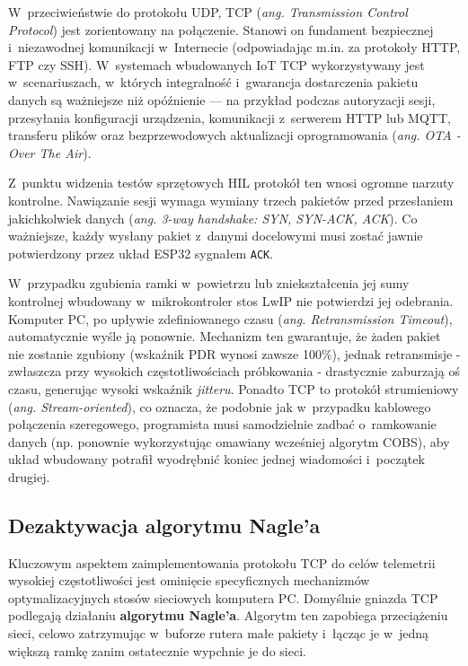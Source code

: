 W~przeciwieństwie do protokołu UDP, TCP (\textit{ang. Transmission Control Protocol}) jest zorientowany na połączenie.
Stanowi on fundament bezpiecznej i~niezawodnej komunikacji w~Internecie (odpowiadając m.in. za protokoły HTTP, FTP czy SSH).
W~systemach wbudowanych IoT TCP wykorzystywany jest w~scenariuszach, w~których integralność i~gwarancja dostarczenia pakietu danych są ważniejsze niż opóźnienie — na przykład podczas autoryzacji sesji, przesyłania konfiguracji urządzenia, komunikacji z~serwerem HTTP lub MQTT, transferu plików oraz bezprzewodowych aktualizacji oprogramowania (\textit{ang. OTA - Over The Air}).

Z~punktu widzenia testów sprzętowych HIL protokół ten wnosi ogromne narzuty kontrolne.
Nawiązanie sesji wymaga wymiany trzech pakietów przed przesłaniem jakichkolwiek danych (\textit{ang. 3-way handshake: SYN, SYN-ACK, ACK}).
Co ważniejsze, każdy wysłany pakiet z~danymi docelowymi musi zostać jawnie potwierdzony przez układ ESP32 sygnałem \texttt{ACK}.

W~przypadku zgubienia ramki w~powietrzu lub zniekształcenia jej sumy kontrolnej wbudowany w~mikrokontroler stos LwIP nie potwierdzi jej odebrania.
Komputer PC, po upływie zdefiniowanego czasu (\textit{ang. Retransmission Timeout}), automatycznie wyśle ją ponownie.
Mechanizm ten gwarantuje, że żaden pakiet nie zostanie zgubiony (wskaźnik PDR wynosi zawsze 100\%), jednak retransmisje - zwłaszcza przy wysokich częstotliwościach próbkowania - drastycznie zaburzają oś czasu, generując wysoki wskaźnik \textit{jitteru}.
Ponadto TCP to protokół strumieniowy (\textit{ang. Stream-oriented}), co oznacza, że podobnie jak w~przypadku kablowego połączenia szeregowego, programista musi samodzielnie zadbać o~ramkowanie danych (np. ponownie wykorzystując omawiany wcześniej algorytm COBS), aby układ wbudowany potrafił wyodrębnić koniec jednej wiadomości i~początek drugiej.

\subsection{Dezaktywacja algorytmu Nagle'a}
Kluczowym aspektem zaimplementowania protokołu TCP do celów telemetrii wysokiej częstotliwości jest ominięcie specyficznych mechanizmów optymalizacyjnych stosów sieciowych komputera PC.
Domyślnie gniazda TCP podlegają działaniu \textbf{algorytmu Nagle'a}.
Algorytm ten zapobiega przeciążeniu sieci, celowo zatrzymując w~buforze rutera małe pakiety i~łącząc je w~jedną większą ramkę zanim ostatecznie wypchnie je do sieci.

